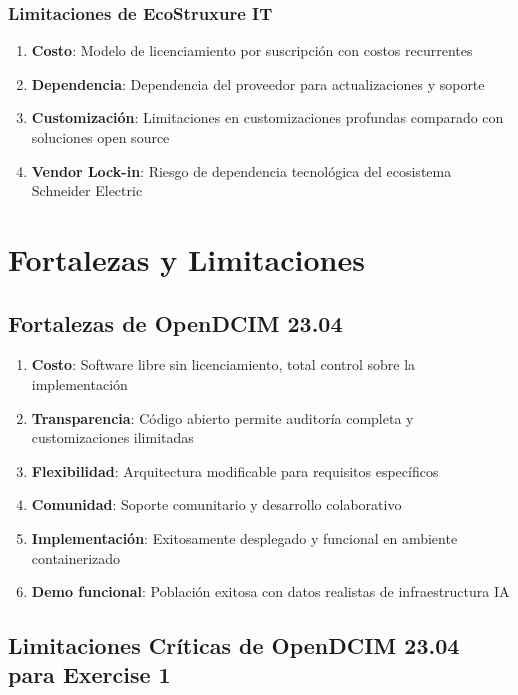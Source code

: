\documentclass[12pt,a4paper]{article}
\begin{document}
\subsubsection{Limitaciones de EcoStruxure IT}

\begin{enumerate}
    \item \textbf{Costo}: Modelo de licenciamiento por suscripción con costos recurrentes
    \item \textbf{Dependencia}: Dependencia del proveedor para actualizaciones y soporte
    \item \textbf{Customización}: Limitaciones en customizaciones profundas comparado con soluciones open source
    \item \textbf{Vendor Lock-in}: Riesgo de dependencia tecnológica del ecosistema Schneider Electric
\end{enumerate}

\section{Fortalezas y Limitaciones}

\subsection{Fortalezas de OpenDCIM 23.04}

\begin{enumerate}
    \item \textbf{Costo}: Software libre sin licenciamiento, total control sobre la implementación
    \item \textbf{Transparencia}: Código abierto permite auditoría completa y customizaciones ilimitadas
    \item \textbf{Flexibilidad}: Arquitectura modificable para requisitos específicos
    \item \textbf{Comunidad}: Soporte comunitario y desarrollo colaborativo
    \item \textbf{Implementación}: Exitosamente desplegado y funcional en ambiente containerizado
    \item \textbf{Demo funcional}: Población exitosa con datos realistas de infraestructura IA
\end{enumerate}

\subsection{Limitaciones Críticas de OpenDCIM 23.04 para Exercise 1}
\end{document}

